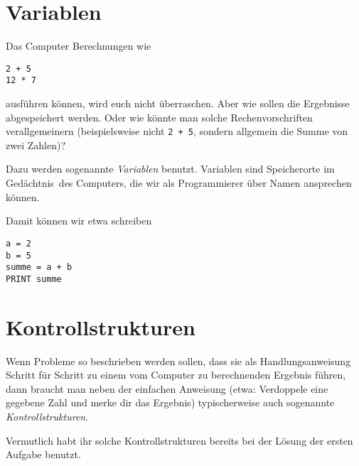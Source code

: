 \clearpage

\rehead[]{\textcolor{lightblue}{AvHG, Inf, My}}
\lohead[]{\textcolor{lightblue}{AvHG, Inf, My}}

\lstset{style=myJava}


\section{Variablen}

Das Computer Berechnungen wie

\begin{lstlisting}
2 + 5
12 * 7
\end{lstlisting}

ausführen können, wird euch nicht überraschen. Aber wie sollen die Ergebnisse
abgespeichert werden. Oder wie könnte man solche Rechenvorschriften
verallgemeinern (beispielsweise nicht \lstinline|2 + 5|, sondern allgemein die
Summe von zwei Zahlen)?

Dazu werden sogenannte \emph{Variablen} benutzt. Variablen sind Speicherorte im
\glqq Gedächtnis\grqq\ des Computers, die wir als Programmierer über Namen
ansprechen können.

Damit können wir etwa schreiben

\begin{lstlisting}
a = 2
b = 5
summe = a + b
PRINT summe
\end{lstlisting}


\section{Kontrollstrukturen}

Wenn Probleme so beschrieben werden sollen, dass sie als Handlungsanweisung
Schritt für Schritt zu einem vom Computer zu berechnenden Ergebnis führen, dann
braucht man neben der einfachen Anweisung (etwa: Verdoppele eine gegebene Zahl
und merke dir das Ergebnis) typischerweise auch sogenannte
\emph{Kontrollstrukturen}.

Vermutlich habt ihr solche Kontrollstrukturen bereits bei der Lösung der ersten
Aufgabe benutzt.

